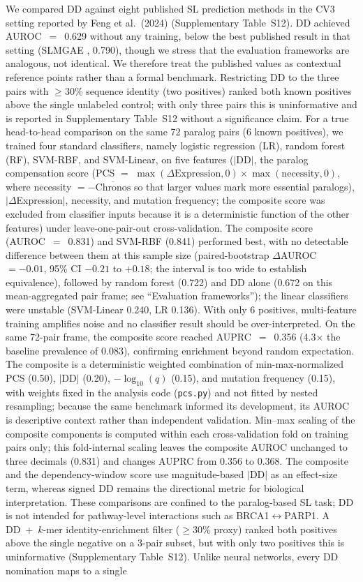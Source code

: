 \documentclass[11pt,a4paper]{article}
\begin{document}
We compared DD against eight published SL prediction methods in the CV3 setting reported by Feng et al.\ (2024) \cite{Feng2024} (Supplementary Table~S12). DD achieved AUROC~$=$~0.629 without any training, below the best published result in that setting (SLMGAE \cite{Hao2021}, 0.790), though we stress that the evaluation frameworks are analogous, not identical. We therefore treat the published values as contextual reference points rather than a formal benchmark. Restricting DD to the three pairs with $\geq$30\% sequence identity (two positives) ranked both known positives above the single unlabeled control; with only three pairs this is uninformative and is reported in Supplementary Table~S12 without a significance claim. For a true head-to-head comparison on the same 72 paralog pairs (6 known positives), we trained four standard classifiers, namely logistic regression (LR), random forest (RF), SVM-RBF, and SVM-Linear, on five features ($|$DD$|$, the paralog compensation score (PCS $=$ $\max(\Delta\mathrm{Expression},0)\times\max(\mathrm{necessity},0)$, where necessity $=-\overline{\mathrm{Chronos}}$ so that larger values mark more essential paralogs), $|\Delta$Expression$|$, necessity, and mutation frequency; the composite score was excluded from classifier inputs because it is a deterministic function of the other features) under leave-one-pair-out cross-validation. The composite score (AUROC~$=$~0.831) and SVM-RBF (0.841) performed best, with no detectable difference between them at this sample size (paired-bootstrap $\Delta$AUROC~$=-0.01$, 95\% CI $-0.21$ to $+0.18$; the interval is too wide to establish equivalence), followed by random forest (0.722) and DD alone (0.672 on this mean-aggregated pair frame; see ``Evaluation frameworks''); the linear classifiers were unstable (SVM-Linear 0.240, LR 0.136). With only 6 positives, multi-feature training amplifies noise and no classifier result should be over-interpreted. On the same 72-pair frame, the composite score reached AUPRC~$=$~0.356 (4.3$\times$ the baseline prevalence of 0.083), confirming enrichment beyond random expectation. The composite is a deterministic weighted combination of min-max-normalized PCS (0.50), $|$DD$|$ (0.20), $-\log_{10}(q)$ (0.15), and mutation frequency (0.15), with weights fixed in the analysis code (\texttt{pcs.py}) and not fitted by nested resampling; because the same benchmark informed its development, its AUROC is descriptive context rather than independent validation. Min--max scaling of the composite components is computed within each cross-validation fold on training pairs only; this fold-internal scaling leaves the composite AUROC unchanged to three decimals (0.831) and changes AUPRC from 0.356 to 0.368. The composite and the dependency-window score use magnitude-based $|$DD$|$ as an effect-size term, whereas signed DD remains the directional metric for biological interpretation. These comparisons are confined to the paralog-based SL task; DD is not intended for pathway-level interactions such as BRCA1$\leftrightarrow$PARP1. A DD~+~$k$-mer identity-enrichment filter ($\ge$30\% proxy) ranked both positives above the single negative on a 3-pair subset, but with only two positives this is uninformative (Supplementary Table~S12). Unlike neural networks, every DD nomination maps to a single 
\end{document}
